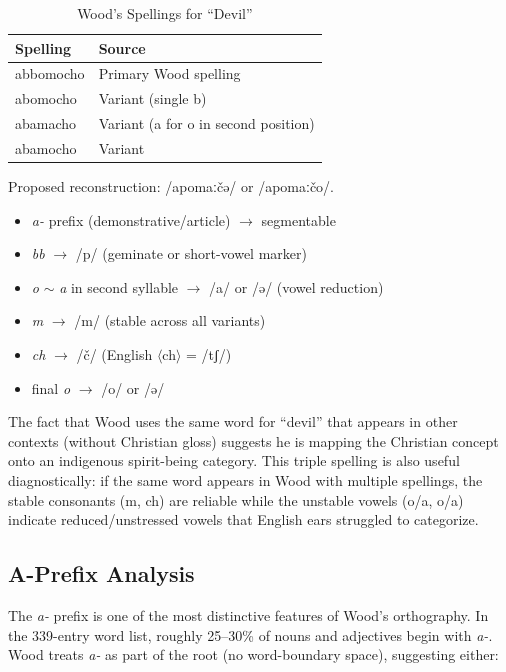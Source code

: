 \begin{table}[htbp]
\centering
\caption{Wood's Spellings for ``Devil''}
\label{tab:1367-devil}
\begin{tabular}{ll}
\hline
Spelling & Source \\
\hline
abbomocho & Primary Wood spelling \\
abomocho & Variant (single b) \\
abamacho & Variant (a for o in second position) \\
abamocho & Variant \\
\hline
\end{tabular}
\end{table}

Proposed reconstruction: /apomaːčə/ or /apomaːčo/.

\begin{itemize}
  \item \emph{a-} prefix (demonstrative/article) $\rightarrow$ segmentable
  \item \emph{bb} $\rightarrow$ /p/ (geminate or short-vowel marker)
  \item \emph{o} $\sim$ \emph{a} in second syllable $\rightarrow$ /a/ or /ə/
    (vowel reduction)
  \item \emph{m} $\rightarrow$ /m/ (stable across all variants)
  \item \emph{ch} $\rightarrow$ /č/ (English $\langle$ch$\rangle$ = /tʃ/)
  \item final \emph{o} $\rightarrow$ /o/ or /ə/
\end{itemize}

The fact that Wood uses the same word for ``devil'' that appears in other
contexts (without Christian gloss) suggests he is mapping the Christian concept
onto an indigenous spirit-being category. This triple spelling is also useful
diagnostically: if the same word appears in Wood with multiple spellings, the
stable consonants (m, ch) are reliable while the unstable vowels (o/a, o/a)
indicate reduced/unstressed vowels that English ears struggled to categorize.

\subsection{A-Prefix Analysis}

The \emph{a-} prefix is one of the most distinctive features of Wood's
orthography. In the 339-entry word list, roughly 25--30\% of nouns and
adjectives begin with \emph{a-}. Wood treats \emph{a-} as part of the root (no
word-boundary space), suggesting either:

